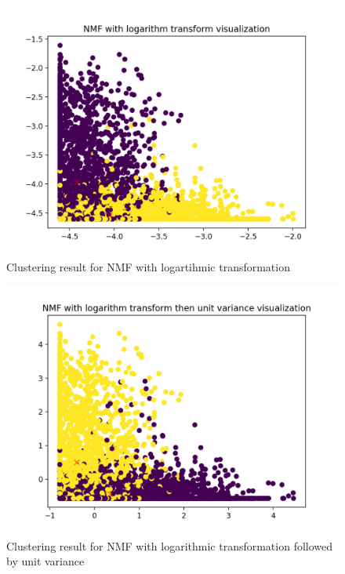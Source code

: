 \documentclass{report}
\begin{document}
\begin{figure}
  \includegraphics[width=\linewidth]{nmf_log_4b.png} 
  \vspace*{-20mm}
  \caption{Clustering result for NMF with logartihmic transformation}
  \label{fig:nmf3}
\end{figure}

\begin{figure}
  \includegraphics[width=\linewidth]{nmf_log-scalse_4b.png} 
  \vspace*{-20mm}
  \caption{Clustering result for NMF with logarithmic transformation followed by unit variance}
  \label{fig:nmf4}
\end{figure}
\end{document}
